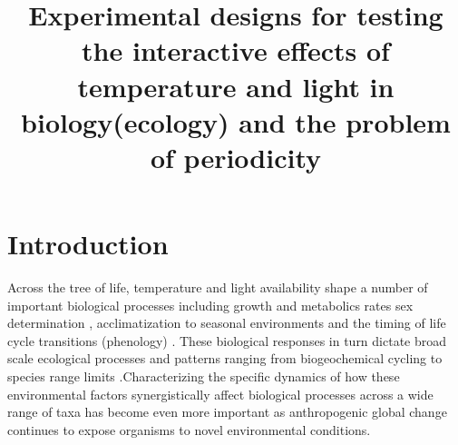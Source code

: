 \documentclass[11pt]{article}
\title{Experimental designs for testing the interactive effects of temperature and light in biology(ecology) and the problem of periodicity }
\begin{document}
\maketitle
\section{Introduction}
\noindent Across the tree of life, temperature and light availability shape a number of important biological processes including growth and metabolics rates \citep{} sex determination \citep{}, acclimatization to seasonal environments \citep{} and the timing of life cycle transitions (phenology) \citep{}. These biological responses in turn dictate broad scale ecological processes and patterns ranging from biogeochemical cycling \citep{} to species range limits \citep{}.Characterizing the specific dynamics of how these environmental factors synergistically affect biological processes across a wide range of taxa has become even more important as anthropogenic global change continues to expose organisms to novel environmental conditions.\


\end{document}
